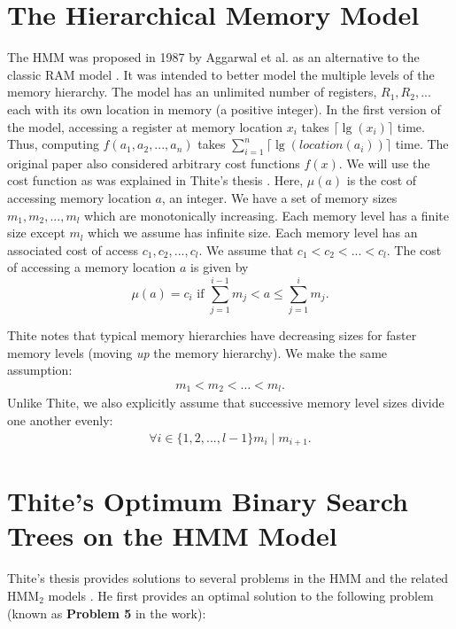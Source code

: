 \documentclass[letterpaper,12pt,titlepage,oneside,final]{book}
\theoremstyle{plain}
\begin{document}
\section{The Hierarchical Memory Model}\label{The Hierarchical Memory Model}

The HMM was proposed in 1987 by Aggarwal et al. as an alternative to the classic RAM model \cite{aggarwal1987model}. It was intended to better model the multiple levels of the memory hierarchy. The model has an unlimited number of registers, $R_1, R_2, ...$ each with its own location in memory (a positive integer). In the first version of the model, accessing a register at memory location $x_i$ takes $\lceil \lg(x_i) \rceil$ time. Thus, computing $f(a_1, a_2, ..., a_n)$ takes $\sum_{i=1}^{n} \lceil \lg(location(a_i)) \rceil$ time. The original paper also considered arbitrary cost functions $f(x)$. We will use the cost function as was explained in Thite's thesis \cite{thite2008optimum}. Here, $\mu (a)$ is the cost of accessing memory location $a$, an integer. We have a set of memory sizes $m_1, m_2, ..., m_l$ which are monotonically increasing. Each memory level has a finite size except $m_l$ which we assume has infinite size. Each memory level has an associated cost of access $c_1, c_2, ..., c_l$. We assume that $c_1 < c_2 < ... < c_l$. The cost of accessing a memory location $a$ is given by
\begin{equation}
\mu (a) = c_i \text{ if } \sum_{j = 1}^{i-1}m_j  < a \leq \sum_{j = 1}^{i}m_j.
\end{equation}


\noindent Thite notes that typical memory hierarchies have decreasing sizes for faster memory levels (moving \textit{up} the memory hierarchy). We make the same assumption:
\begin{align*}
m_1 < m_2 < ... < m_l.
\end{align*}
Unlike Thite, we also explicitly assume that successive memory level sizes divide one another evenly:
\begin{align*}
\forall i \in  \{1,2,...,l-1\} m_i \mid m_{i+1}.
\end{align*}

\section{Thite's Optimum Binary Search Trees on the HMM Model}

Thite's thesis provides solutions to several problems in the HMM and the related HMM$_2$ models \cite{thite2008optimum}. He first provides an optimal solution to the following problem (known as \textbf{Problem 5} in the work):\\
\end{document}
